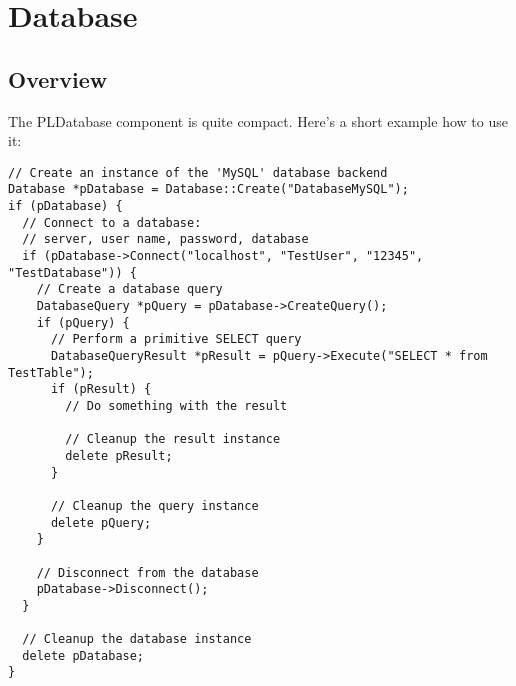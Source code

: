 \chapter{Database}




\section{Overview}
The PLDatabase component is quite compact. Here's a short example how to use it:

\begin{lstlisting}[caption=Using the PLDatabase component]
// Create an instance of the 'MySQL' database backend
Database *pDatabase = Database::Create("DatabaseMySQL");
if (pDatabase) {
  // Connect to a database:
  // server, user name, password, database
  if (pDatabase->Connect("localhost", "TestUser", "12345", "TestDatabase")) {
    // Create a database query
    DatabaseQuery *pQuery = pDatabase->CreateQuery();
    if (pQuery) {
      // Perform a primitive SELECT query
      DatabaseQueryResult *pResult = pQuery->Execute("SELECT * from TestTable");
      if (pResult) {
        // Do something with the result

        // Cleanup the result instance
        delete pResult;
      }

      // Cleanup the query instance
      delete pQuery;
    }

    // Disconnect from the database
    pDatabase->Disconnect();
  }

  // Cleanup the database instance
  delete pDatabase;
}
\end{lstlisting}
